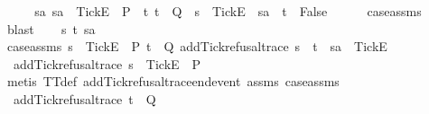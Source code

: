 {\ \ \isamarkupfalse%
\ \isamarkupfalse%
\ {\isachardoublequoteopen}{\isasymforall}sa{\isachardot}\ sa\ {\isacharat}\ {\isacharbrackleft}{\isacharbrackleft}Tick{\isacharbrackright}\isactrlsub E{\isacharbrackright}\ {\isasymin}\ P\ {\isasymlongrightarrow}\ {\isacharparenleft}{\isasymforall}t{\isachardot}\ t\ {\isasymin}\ Q\ {\isasymlongrightarrow}\ s\ {\isacharat}\ {\isacharbrackleft}{\isacharbrackleft}Tick{\isacharbrackright}\isactrlsub E{\isacharbrackright}\ {\isasymnoteq}\ sa\ {\isacharat}\ t{\isacharparenright}\ {\isasymLongrightarrow}\ False{\isachardoublequoteclose}\isanewline
\ \ \ \ \isamarkupfalse%
\ case{\isacharunderscore}assms{\isacharparenleft}{}{\isacharparenright}\ \isamarkupfalse%
\ blast\isanewline
{}\isamarkupfalse%
\isanewline
\ \ \isamarkupfalse%
\ s\ t\ sa\isanewline
\ \ \isamarkupfalse%
\ case{\isacharunderscore}assms{\isacharcolon}\ {\isachardoublequoteopen}s\ {\isacharat}\ {\isacharbrackleft}{\isacharbrackleft}Tick{\isacharbrackright}\isactrlsub E{\isacharbrackright}\ {\isasymin}\ P{\isachardoublequoteclose}\ {\isachardoublequoteopen}t\ {\isasymin}\ Q{\isachardoublequoteclose}\ {\isachardoublequoteopen}add{\isacharunderscore}Tick{\isacharunderscore}refusal{\isacharunderscore}trace\ {\isacharparenleft}s\ {\isacharat}\ t{\isacharparenright}\ {\isacharequal}\ sa\ {\isacharat}\ {\isacharbrackleft}{\isacharbrackleft}Tick{\isacharbrackright}\isactrlsub E{\isacharbrackright}{\isachardoublequoteclose}\isanewline
\ \ \isamarkupfalse%
\ {}{\isacharcolon}\ {\isachardoublequoteopen}add{\isacharunderscore}Tick{\isacharunderscore}refusal{\isacharunderscore}trace\ s\ {\isacharat}\ {\isacharbrackleft}{\isacharbrackleft}Tick{\isacharbrackright}\isactrlsub E{\isacharbrackright}\ {\isasymin}\ P{\isachardoublequoteclose}\isanewline
\ \ \ \ \isamarkupfalse%
\ {\isacharparenleft}metis\ TT{}{\isacharunderscore}def\ add{\isacharunderscore}Tick{\isacharunderscore}refusal{\isacharunderscore}trace{\isacharunderscore}end{\isacharunderscore}event\ assms{\isacharparenleft}{}{\isacharparenright}\ case{\isacharunderscore}assms{\isacharparenleft}{}{\isacharparenright}{\isacharparenright}\isanewline
\ \ \isamarkupfalse%
\ {}{\isacharcolon}\ {\isachardoublequoteopen}add{\isacharunderscore}Tick{\isacharunderscore}refusal{\isacharunderscore}trace\ t\ {\isasymin}\ Q{\isachardoublequoteclose}\isanewline
\ \ \ \ \isamarkupfalse%
}
